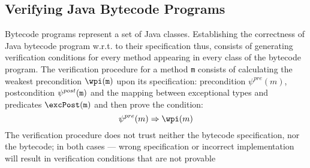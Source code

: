 \subsection{Verifying Java Bytecode Programs} Bytecode programs represent a set of Java classes. Establishing the correctness of Java bytecode program w.r.t. to their specification thus, consists of generating verification conditions for every method appearing in every class of the bytecode program.
The verification procedure for a method \texttt{m} consists of  calculating the weakest precondition $\wpi(\tt{m})$ upon its specification: precondition $\psi^{pre}(m)$, 
postcondition $\psi^{post}(\tt{m})$ and the mapping between exceptional types and predicates $\excPost(\tt{m})$ and then prove the condition: 
$$
\psi^{pre}(m)  \Rightarrow \wpi(m)
$$    
The verification procedure does not trust neither the bytecode specification, nor the bytecode; in both cases --- wrong 
specification or incorrect implementation will result in verification conditions that are not provable 



